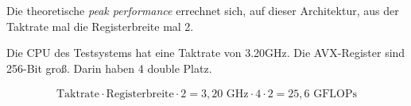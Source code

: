 Die theoretische \textit{peak performance} errechnet sich, auf dieser Architektur, aus der Taktrate mal die Registerbreite mal 2. 



Die CPU des Testsystems hat eine Taktrate von 3.20GHz.
Die AVX-Register sind 256-Bit groß. Darin haben 4 double Platz.

\begin{align*}
  \text{Taktrate} \cdot \text{Registerbreite} \cdot 2= 3,20 \text{ GHz} \cdot 4 \cdot 2 = 25,6 \text{ GFLOPs}
\end{align*}

%








   
